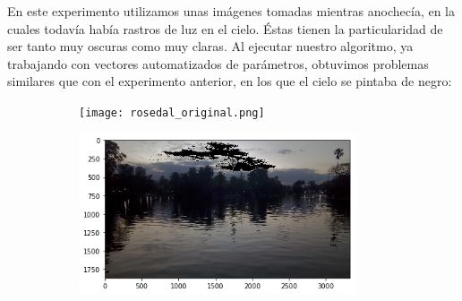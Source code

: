 \documentclass[10pt, a4paper]{article}
\begin{document}
En este experimento utilizamos unas imágenes tomadas mientras anochecía, en la cuales todavía había rastros de luz en el cielo. Éstas tienen la particularidad de ser tanto muy oscuras como muy claras. Al ejecutar nuestro algoritmo, ya trabajando con vectores automatizados de parámetros, obtuvimos problemas similares que con el experimento anterior, en los que el cielo se pintaba de negro:

\begin{figure}[H]	
	\centering
    \begin{subfigure}{0.5\textwidth}
	\centering
        \texttt{[image: rosedal\_original.png]}
    \end{subfigure}\hfill
    \begin{subfigure}{0.5\textwidth}
    	\centering
        \includegraphics[width=0.9\textwidth]{rosedal-algoritmo.png}
    \end{subfigure}\hfill	
\end{figure}
\end{document}
